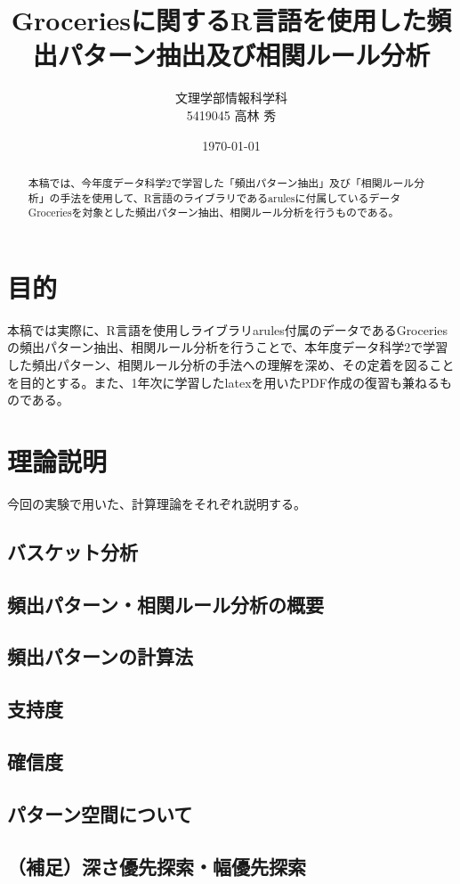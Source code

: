 \documentclass[dvipdfmx]{jsarticle}
\title{Groceriesに関するR言語を使用した頻出パターン抽出及び相関ルール分析}
\author{文理学部情報科学科\\5419045 高林 秀}
\date{\today}
\begin{document}
\maketitle

\begin{abstract}
  本稿では、今年度データ科学2で学習した「頻出パターン抽出」及び「相関ルール分析」の手法を使用して、R言語のライブラリであるarulesに付属しているデータGroceriesを対象とした頻出パターン抽出、相関ルール分析を行うものである。

\end{abstract}

\section{目的}
本稿では実際に、R言語を使用しライブラリarules付属のデータであるGroceriesの頻出パターン抽出、相関ルール分析を行うことで、本年度データ科学2で学習した頻出パターン、相関ルール分析の手法への理解を深め、その定着を図ることを目的とする。また、1年次に学習したlatexを用いたPDF作成の復習も兼ねるものである。
\section{理論説明}
今回の実験で用いた、計算理論をそれぞれ説明する。
\subsection{バスケット分析}
\subsection{頻出パターン・相関ルール分析の概要}
\subsection{頻出パターンの計算法}
\subsection{支持度}
\subsection{確信度}
\subsection{パターン空間について}
\subsection{（補足）深さ優先探索・幅優先探索}
\end{document}
